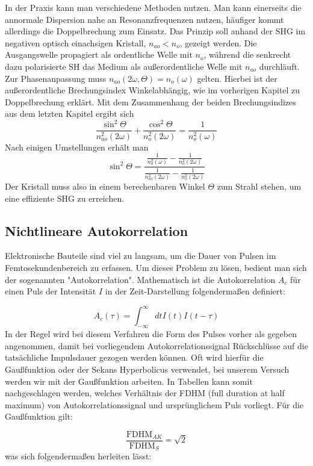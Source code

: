 In der Praxis kann man verschiedene Methoden nutzen. Man kann einerseits die 
annormale Dispersion nahe an Resonanzfrequenzen nutzen, häufiger kommt allerdings
die Doppelbrechung zum Einsatz. Das Prinzip soll anhand der SHG im negativen
optisch einachsigen Kristall, $n_{ao} < n_o$, gezeigt werden.
Die Ausgangswelle propagiert als ordentliche Welle mit $n_o$, während die 
senkrecht dazu polarisierte SH das Medium als außerordentliche Welle mit $n_{ao}$ 
durchläuft. Zur Phasenanpassung muss $n_{ao} (2 \omega, \Theta) = n_o(\omega)$ 
gelten. Hierbei ist der außerordentliche Brechungsindex Winkelabhängig, wie im
vorherigen Kapitel zu Doppelbrechung erklärt. Mit dem Zusammenhang der beiden
Brechungsindizes aus dem letzten Kapitel ergibt sich
\[
    \frac{\sin^2 \Theta}{n_{ao}^2(2\omega)} + \frac{\cos^2 \Theta}{n_o^2 (2\omega)}
    = \frac{1}{n_o^2 (\omega)}
\]
Nach einigen Umstellungen erhält man
\[
    \sin^2 \Theta = \frac{
                        \frac{1}{n_o^2(\omega)} - \frac{1}{n_o^2(2\omega)}
                    }{
                        \frac{1}{n_{ao}^2(2\omega)} - \frac{1}{n_o^2(2\omega)}
                    }
\]
Der Kristall muss also in einem berechenbaren Winkel $\Theta$ zum Strahl stehen,
um eine effiziente SHG zu erreichen.

\autocite{Boyd}

    \subsection{Nichtlineare Autokorrelation}

Elektronische Bauteile sind viel zu langsam, um die Dauer von Pulsen im Femtosekundenbereich zu erfassen. Um dieses Problem zu lösen, bedient man sich der sogenannten "{}Autokorrelation". 
Mathematisch ist die Autokorrelation $A_{c}$ für einen Puls der Intensität $I$ in der Zeit-Darstellung folgendermaßen definiert:

\[A_{c}(\tau)=\int_{-\infty}^{\infty}dt I(t)I(t-\tau)\]
In der Regel wird bei diesem Verfahren die Form des Pulses vorher als gegeben angenommen, damit bei vorliegendem Autokorrelationssignal Rückschlüsse auf die tatsächliche Impulsdauer gezogen werden können. Oft wird hierfür die Gaußfunktion oder der Sekans Hyperbolicus verwendet, bei unserem Versuch werden wir mit der Gaußfunktion arbeiten. In Tabellen kann somit nachgeschlagen werden, welches Verhältnis der FDHM (full duration at half maximum) von Autokorrelationssignal und ursprünglichem Puls vorliegt. Für die Gaußfunktion gilt:

\[\dfrac{\text{FDHM}_{AK}}{\text{FDHM}_{S}}=\sqrt{2}\]
was sich folgendermaßen herleiten lässt:

